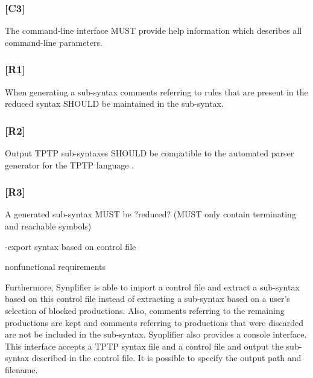 \subsubsection{[C3]}\label{C3}
The command-line interface MUST provide help information which describes all command-line parameters.
\subsubsection{[R1]}\label{R1}
When generating a sub-syntax comments referring to rules that are present in the reduced syntax SHOULD be maintained in the sub-syntax.
\subsubsection{[R2]}\label{R2}
Output \ac{TPTP} sub-syntaxes SHOULD be compatible to the automated parser generator for the \ac{TPTP} language \cite{VS06}.
\subsubsection{[R3]}\label{R3}
A generated sub-syntax MUST be ?reduced? (MUST only contain terminating and reachable symbols)

-export syntax based on control file

nonfunctional requirements

Furthermore, \ac{Synplifier} is able to import a control file and extract a sub-syntax based on this control file instead of extracting a sub-syntax based on a user's selection of blocked productions.
Also, comments referring to the remaining productions are kept and comments referring to productions that were discarded are not be included in the sub-syntax.
\ac{Synplifier} also provides a console interface. This interface accepts a \ac{TPTP} syntax file and a control file and output the sub-syntax described in the control file. It is possible to specify the output path and filename.

